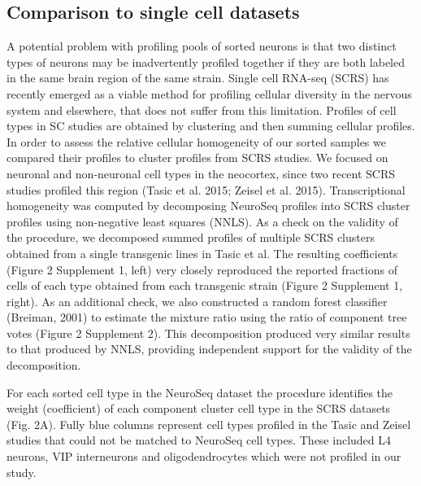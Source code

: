 \subsection{Comparison to single cell datasets}
A potential problem with profiling pools of sorted neurons is that two distinct types of neurons may be inadvertently profiled together if they are both labeled in the same brain region of the same strain. Single cell RNA-seq (SCRS) has recently emerged as a viable method for profiling cellular diversity in the nervous system and elsewhere, that does not suffer from this limitation. Profiles of cell types in SC studies are obtained by clustering and then summing cellular profiles. In order to assess the relative cellular homogeneity of our sorted samples we compared their profiles to cluster profiles from SCRS studies. We focused on neuronal and non-neuronal cell types in the neocortex, since two recent SCRS studies profiled this region (Tasic et al. 2015; Zeisel et al. 2015). Transcriptional homogeneity was computed by decomposing NeuroSeq profiles into SCRS cluster profiles using non-negative least squares (NNLS). As a check on the validity of the procedure, we decomposed summed profiles of multiple SCRS clusters obtained from a single transgenic lines in Tasic et al. The resulting coefficients (Figure 2 Supplement 1, left) very closely reproduced the reported fractions of cells of each type obtained from each transgenic strain (Figure 2 Supplement 1, right). As an additional check, we also constructed a random forest classifier (Breiman, 2001) to estimate the mixture ratio using the ratio of component tree votes (Figure 2 Supplement 2). This decomposition produced very similar results to that produced by NNLS, providing independent support for the validity of the decomposition. 

For each sorted cell type in the NeuroSeq dataset the procedure identifies the weight (coefficient) of each component cluster cell type in the SCRS datasets (Fig. 2A). Fully blue columns represent cell types profiled in the Tasic and Zeisel studies that could not be matched to NeuroSeq cell types. These included L4 neurons, VIP interneurons and oligodendrocytes which were not profiled in our study. 

